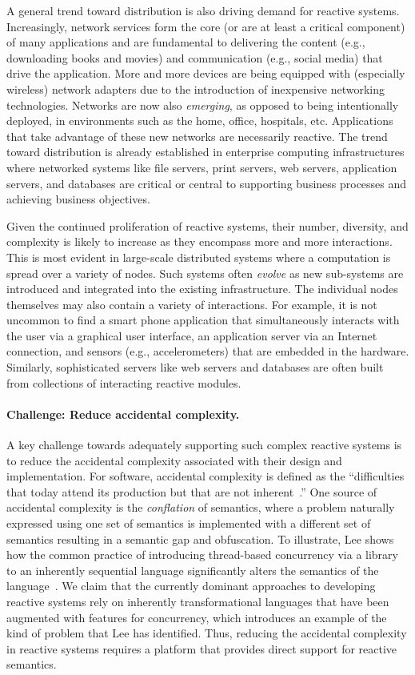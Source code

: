 A general trend toward distribution is also driving demand for reactive systems.
Increasingly, network services form the core (or are at least a critical component) of many applications and are fundamental to delivering the content (e.g., downloading books and movies) and communication (e.g., social media) that drive the application.
More and more devices are being equipped with (especially wireless) network adapters due to the introduction of inexpensive networking technologies.
Networks are now also \emph{emerging}, as opposed to being intentionally deployed, in environments such as the home, office, hospitals, etc.
Applications that take advantage of these new networks are necessarily reactive.
The trend toward distribution is already established in enterprise computing infrastructures where networked systems like file servers, print servers, web servers, application servers, and databases are critical or central to supporting business processes and achieving business objectives.

Given the continued proliferation of reactive systems, their number, diversity, and complexity is likely to increase as they encompass more and more interactions.
This is most evident in large-scale distributed systems where a computation is spread over a variety of nodes.
Such systems often \emph{evolve} as new sub-systems are introduced and integrated into the existing infrastructure.
The individual nodes themselves may also contain a variety of interactions.
For example, it is not uncommon to find a smart phone application that simultaneously interacts with the user via a graphical user interface, an application server via an Internet connection, and sensors (e.g., accelerometers) that are embedded in the hardware.
Similarly, sophisticated servers like web servers and databases are often built from collections of interacting reactive modules.

\paragraph{Challenge:  Reduce accidental complexity.}
A key challenge towards adequately supporting such complex reactive systems is to reduce the accidental complexity associated with their design and implementation.
For software, accidental complexity is defined as the ``difficulties that today attend its production but that are not inherent~\cite{brooks1995mythical}.''
One source of accidental complexity is the \emph{conflation} of semantics, where a problem naturally expressed using one set of semantics is implemented with a different set of semantics resulting in a semantic gap and obfuscation.
To illustrate, Lee shows how the common practice of introducing thread-based concurrency via a library to an inherently sequential language significantly alters the semantics of the language~\cite{lee2006problem}.
We claim that the currently dominant approaches to developing reactive systems rely on inherently transformational languages that have been augmented with features for concurrency, which introduces an example of the kind of problem that Lee has identified.
Thus, reducing the accidental complexity in reactive systems requires a platform that provides direct support for reactive semantics.

